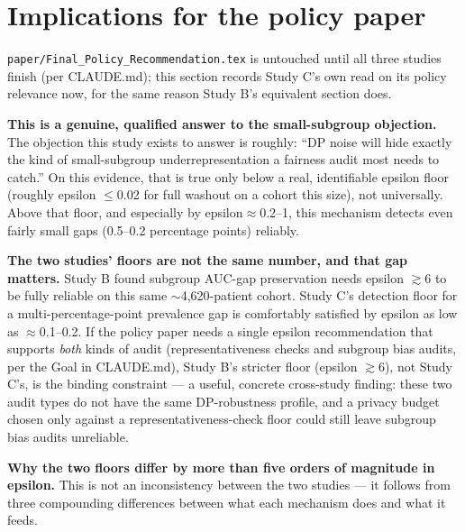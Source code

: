 \documentclass[11pt]{article}
\begin{document}
\section{Implications for the policy paper}
\label{sec:policy-implications}

\texttt{paper/Final\_Policy\_Recommendation.tex} is untouched until all three studies finish (per CLAUDE.md); this section records Study C's own read on its policy relevance now, for the same reason Study B's equivalent section does.

\textbf{This is a genuine, qualified answer to the small-subgroup objection.} The objection this study exists to answer is roughly: ``DP noise will hide exactly the kind of small-subgroup underrepresentation a fairness audit most needs to catch.'' On this evidence, that is true only below a real, identifiable epsilon floor (roughly epsilon $\leq$0.02 for full washout on a cohort this size), not universally. Above that floor, and especially by epsilon$\approx$0.2--1, this mechanism detects even fairly small gaps (0.5--0.2 percentage points) reliably.

\textbf{The two studies' floors are not the same number, and that gap matters.} Study B found subgroup AUC-gap preservation needs epsilon $\gtrsim$6 to be fully reliable on this same $\sim$4,620-patient cohort. Study C's detection floor for a multi-percentage-point prevalence gap is comfortably satisfied by epsilon as low as $\approx$0.1--0.2. If the policy paper needs a single epsilon recommendation that supports \emph{both} kinds of audit (representativeness checks and subgroup bias audits, per the Goal in CLAUDE.md), Study B's stricter floor (epsilon $\gtrsim$6), not Study C's, is the binding constraint --- a useful, concrete cross-study finding: these two audit types do not have the same DP-robustness profile, and a privacy budget chosen only against a representativeness-check floor could still leave subgroup bias audits unreliable.

\textbf{Why the two floors differ by more than five orders of magnitude in epsilon.} This is not an inconsistency between the two studies --- it follows from three compounding differences between what each mechanism does and what it feeds.
\end{document}
